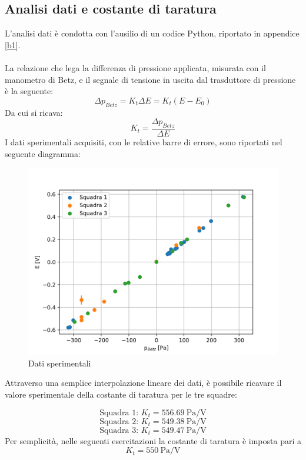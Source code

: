 \subsection{Analisi dati e costante di taratura}
L'analisi dati è condotta con l'ausilio di un codice Python, riportato in appendice \ref{b1}.\\\\
La relazione che lega la differenza di pressione applicata, misurata con il manometro di Betz, e il segnale di tensione in uscita dal trasduttore di pressione è la seguente:
\begin{equation*}
    \Delta p_{Betz} = K_t \Delta E = K_t (E - E_0)
\end{equation*}
Da cui si ricava:
\begin{equation*}
    K_t = \frac{\Delta p_{Betz}}{\Delta E}
\end{equation*}
\newpage
\noindent I dati sperimentali acquisiti, con le relative barre di errore, sono riportati nel seguente diagramma:
\begin{figure}[h]
    \centering
    \includegraphics[width=\textwidth]{images/1/kt.png}
    \caption{Dati sperimentali}
\end{figure}

\noindent Attraverso una semplice interpolazione lineare dei dati, è possibile ricavare il valore sperimentale della costante di taratura per le tre squadre:

\begin{equation*}
    \text{Squadra 1: } K_t = 556.69\ \text{Pa/V}
\end{equation*}
\begin{equation*}
    \text{Squadra 2: } K_t = 549.38\ \text{Pa/V}
\end{equation*}
\begin{equation*}
    \text{Squadra 3: } K_t = 549.47\ \text{Pa/V}
\end{equation*}
Per semplicità, nelle seguenti esercitazioni la costante di taratura è imposta pari a
\begin{equation*}
    K_t = 550\ \text{Pa/V}
\end{equation*}

